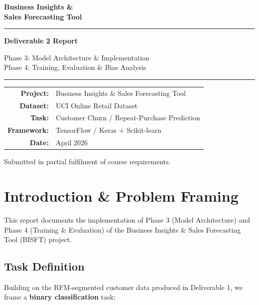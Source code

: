 \documentclass[12pt, a4paper]{article}
\begin{document}
\begin{titlepage}
  \centering
  \vspace*{2cm}
  {\Huge\bfseries\color{primaryblue} Business Insights \&\\[6pt] Sales Forecasting Tool\par}
  \vspace{0.5cm}
  \rule{\linewidth}{1.5pt}
  \vspace{0.4cm}
  {\LARGE\bfseries Deliverable 2 Report\par}
  {\large Phase 3: Model Architecture \& Implementation\\[4pt]
          Phase 4: Training, Evaluation \& Bias Analysis\par}
  \vspace{0.5cm}
  \rule{\linewidth}{0.8pt}
  \vspace{1.5cm}
  \begin{tabular}{rl}
    \textbf{Project:}  & Business Insights \& Sales Forecasting Tool \\[4pt]
    \textbf{Dataset:}  & UCI Online Retail Dataset \\[4pt]
    \textbf{Task:}     & Customer Churn / Repeat-Purchase Prediction \\[4pt]
    \textbf{Framework:}& TensorFlow / Keras $+$ Scikit-learn \\[4pt]
    \textbf{Date:}     & April 2026 \\
  \end{tabular}
  \vfill
  {\small Submitted in partial fulfilment of course requirements.}
\end{titlepage}

\tableofcontents
\newpage

\section{Introduction \& Problem Framing}

This report documents the implementation of Phase 3 (Model Architecture) and Phase 4 (Training \& Evaluation) of the Business Insights \& Sales Forecasting Tool (BISFT) project.

\subsection{Task Definition}
Building on the RFM-segmented customer data produced in Deliverable 1, we frame a \textbf{binary classification} task:
\end{document}
